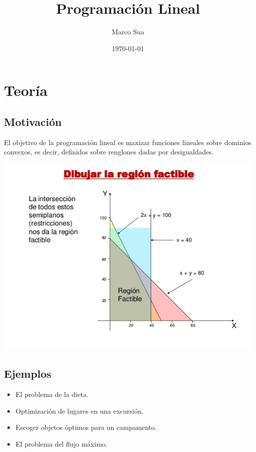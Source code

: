 \documentclass[11pt]{article}
\author{Marco Sua}
\date{\today}
\title{Programación Lineal}
\begin{document}
\maketitle
\tableofcontents


\section{Teoría}
\label{sec:org3a9823e}
\subsection{Motivación}
\label{sec:orgadcef4f}

El objetivo de la programación lineal es maxizar funciones lineales
sobre dominios convexos, es decir, definidos sobre renglones dadas por
desigualdades.

\begin{center}
\includegraphics[width=.9\linewidth]{io-2da-programacion-lineal-32-638.jpg}
\end{center}
\subsection{Ejemplos}
\label{sec:orgcb02db4}

\begin{itemize}
\item El problema de la dieta.
\item Optimización de lugares en una excursión.
\item Escoger objetos óptimos para un campamento.
\item El problema del flujo máximo.
\end{itemize}
\end{document}
